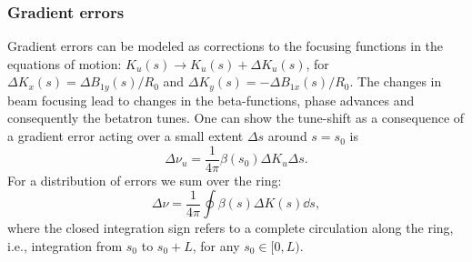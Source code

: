 \subsubsection{Gradient errors}
Gradient errors can be modeled as corrections to the focusing functions in the equations of motion: $K_u(s)\to K_u(s) + \Delta K_u(s)$, for $\Delta K_x(s) = \Delta B_{1y}(s)/R_0$ and $\Delta K_y(s) = -\Delta B_{1x}(s)/R_0$. The changes in beam focusing lead to changes in the beta-functions, phase advances and consequently the betatron tunes. One can show the tune-shift as a consequence of a gradient error acting over a small extent $\Delta s$ around $s=s_0$ is \cite{lee_accelerator_2004}
\begin{equation}
    \Delta \nu_u = \frac{1}{4\pi} \beta(s_0) \Delta K_u \Delta s.
    \label{eq:delta_nu}
\end{equation}
For a distribution of errors we sum over the ring:
\begin{equation}
    \Delta \nu = \frac{1}{4\pi}\oint \beta(s) \Delta K(s) \dd s,
    \label{eq:delta_nu_dist}
\end{equation}
where the closed integration sign refers to a complete circulation along the ring, i.e., integration from $s_0$ to $s_0+L$, for any $s_0\in[0,L)$.

